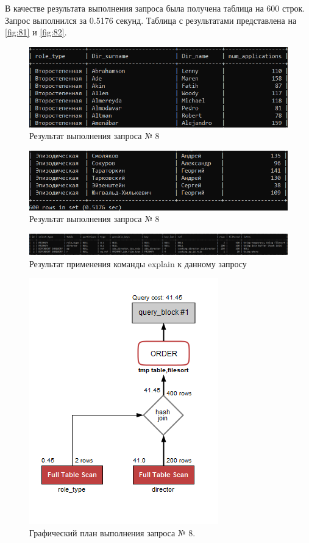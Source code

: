 \documentclass[11pt,a4paper,final]{article} %
\begin{document}
\par В качестве результата выполнения запроса была получена таблица на 600 строк. Запрос выполнился за 0.5176 секунд. Таблица с результатами представлена на \autoref{fig:81} и \autoref{fig:82}.


\begin{figure}[H]
	\centering
	\includegraphics[width=0.6\linewidth]{81.png}
	\caption{Результат выполнения запроса № 8}
	\label{fig:81}
\end{figure}

\begin{figure}[H]
	\centering
	\includegraphics[width=0.6\linewidth]{82.png}
	\caption{Результат выполнения запроса № 8}
	\label{fig:82}
\end{figure}


\begin{figure}[H]
	\centering
	\includegraphics[width=1.0\linewidth]{e8.png}
	\caption{Результат применения команды explain к данному запросу}
	\label{fig:e8}
\end{figure}

\begin{figure}[H]
	\centering
	\includegraphics[width=0.5\linewidth]{ex8.png}
	\caption{Графический план выполнения запроса № 8.}
	\label{fig:ex8}
\end{figure}
\end{document}
